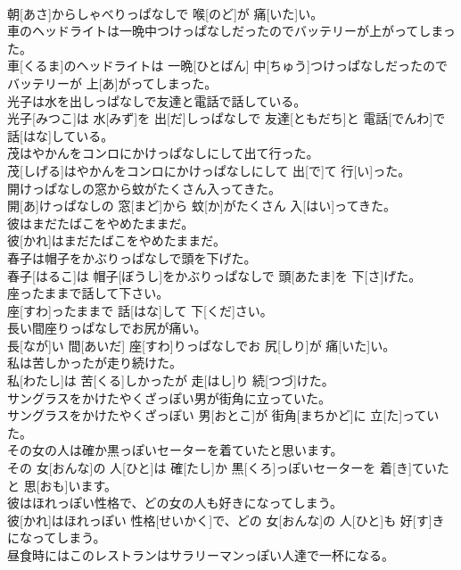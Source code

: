 \documentclass[8pt]{extreport}
\begin{document}
\begin{CJK}{UTF8}{min}
\\	朝[あさ]からしゃべりっぱなしで 喉[のど]が 痛[いた]い。
\\	車のヘッドライトは一晩中つけっぱなしだったのでバッテリーが上がってしまった。	
\\	車[くるま]のヘッドライトは 一晩[ひとばん] 中[ちゅう]つけっぱなしだったのでバッテリーが 上[あ]がってしまった。
\\	光子は水を出しっぱなしで友達と電話で話している。	
\\	光子[みつこ]は 水[みず]を 出[だ]しっぱなしで 友達[ともだち]と 電話[でんわ]で 話[はな]している。
\\	茂はやかんをコンロにかけっぱなしにして出て行った。	
\\	茂[しげる]はやかんをコンロにかけっぱなしにして 出[で]て 行[い]った。
\\	開けっぱなしの窓から蚊がたくさん入ってきた。	
\\	開[あ]けっぱなしの 窓[まど]から 蚊[か]がたくさん 入[はい]ってきた。
\\	彼はまだたばこをやめたままだ。	
\\	彼[かれ]はまだたばこをやめたままだ。
\\	春子は帽子をかぶりっぱなしで頭を下げた。	
\\	春子[はるこ]は 帽子[ぼうし]をかぶりっぱなしで 頭[あたま]を 下[さ]げた。
\\	座ったままで話して下さい。	
\\	座[すわ]ったままで 話[はな]して 下[くだ]さい。
\\	長い間座りっぱなしでお尻が痛い。	
\\	長[なが]い 間[あいだ] 座[すわ]りっぱなしでお 尻[しり]が 痛[いた]い。
\\	私は苦しかったが走り続けた。	
\\	私[わたし]は 苦[くる]しかったが 走[はし]り 続[つづ]けた。
\\	サングラスをかけたやくざっぽい男が街角に立っていた。	
\\	サングラスをかけたやくざっぽい 男[おとこ]が 街角[まちかど]に 立[た]っていた。
\\	その女の人は確か黒っぽいセーターを着ていたと思います。	
\\	その 女[おんな]の 人[ひと]は 確[たし]か 黒[くろ]っぽいセーターを 着[き]ていたと 思[おも]います。
\\	彼はほれっぽい性格で、どの女の人も好きになってしまう。	
\\	彼[かれ]はほれっぽい 性格[せいかく]で、どの 女[おんな]の 人[ひと]も 好[す]きになってしまう。
\\	昼食時にはこのレストランはサラリーマンっぽい人達で一杯になる。	

\end{CJK}
\end{document}
